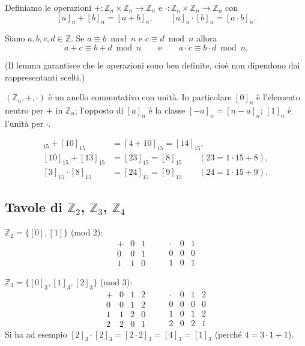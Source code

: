 \documentclass[11pt,a4paper]{article}
\begin{document}
Definiamo le operazioni $+ : \mathbb{Z}_n\times\mathbb{Z}_n \to \mathbb{Z}_n$ e $\cdot : \mathbb{Z}_n\times\mathbb{Z}_n \to \mathbb{Z}_n$ con
\[
  [a]_n + [b]_n = [a + b]_n, \qquad [a]_n\cdot[b]_n = [a\cdot b]_n .
\]

\begin{proposizione}[Lemma]
Siano $a, b, c, d \in \mathbb{Z}$. Se $a \equiv b \bmod n$ e $c \equiv d \bmod n$ allora
\[
  a + c \equiv b + d \bmod n \qquad\text{e}\qquad a\cdot c \equiv b\cdot d \bmod n .
\]
\end{proposizione}

(Il lemma garantisce che le operazioni sono ben definite, cioè non dipendono dai rappresentanti scelti.)

\begin{proposizione}
$(\mathbb{Z}_n, +, \cdot)$ è un anello commutativo con unità. In particolare $[0]_n$ è l'elemento neutro per $+$ in $\mathbb{Z}_n$; l'opposto di $[a]_n$ è la classe $[-a]_n = [n - a]_n$; $[1]_n$ è l'unità per $\cdot$.
\end{proposizione}

\begin{esempio}[in $\mathbb{Z}_{15}$]
\begin{align*}
  [4]_{15} + [10]_{15} &= [4 + 10]_{15} = [14]_{15},\\
  [10]_{15} + [13]_{15} &= [23]_{15} = [8]_{15} \qquad (23 = 1\cdot 15 + 8),\\
  [3]_{15}\cdot[8]_{15} &= [24]_{15} = [9]_{15} \qquad (24 = 1\cdot 15 + 9).
\end{align*}
\end{esempio}

\subsection{Tavole di $\mathbb{Z}_2$, $\mathbb{Z}_3$, $\mathbb{Z}_4$}

$\mathbb{Z}_2 = \{[0], [1]\}$ (mod 2):
\[
\begin{array}{c|cc} + & 0 & 1 \\ \hline 0 & 0 & 1 \\ 1 & 1 & 0 \end{array}
\qquad
\begin{array}{c|cc} \cdot & 0 & 1 \\ \hline 0 & 0 & 0 \\ 1 & 0 & 1 \end{array}
\]

$\mathbb{Z}_3 = \{[0]_3, [1]_3, [2]_3\}$ (mod 3):
\[
\begin{array}{c|ccc} + & 0 & 1 & 2 \\ \hline 0 & 0 & 1 & 2 \\ 1 & 1 & 2 & 0 \\ 2 & 2 & 0 & 1 \end{array}
\qquad
\begin{array}{c|ccc} \cdot & 0 & 1 & 2 \\ \hline 0 & 0 & 0 & 0 \\ 1 & 0 & 1 & 2 \\ 2 & 0 & 2 & 1 \end{array}
\]
Si ha ad esempio $[2]_3\cdot[2]_3 = [2\cdot 2]_3 = [4]_3 = [1]_3$ (perché $4 = 3\cdot 1 + 1$).
\end{document}
